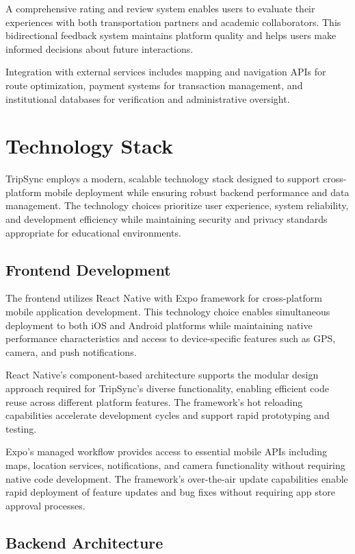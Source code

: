 \documentclass[conference]{IEEEtran}
\begin{document}
A comprehensive rating and review system enables users to evaluate their experiences with both transportation partners and academic collaborators. This bidirectional feedback system maintains platform quality and helps users make informed decisions about future interactions.

Integration with external services includes mapping and navigation APIs for route optimization, payment systems for transaction management, and institutional databases for verification and administrative oversight.

\section{Technology Stack}

TripSync employs a modern, scalable technology stack designed to support cross-platform mobile deployment while ensuring robust backend performance and data management. The technology choices prioritize user experience, system reliability, and development efficiency while maintaining security and privacy standards appropriate for educational environments.

\subsection{Frontend Development}

The frontend utilizes React Native with Expo framework for cross-platform mobile application development. This technology choice enables simultaneous deployment to both iOS and Android platforms while maintaining native performance characteristics and access to device-specific features such as GPS, camera, and push notifications.

React Native's component-based architecture supports the modular design approach required for TripSync's diverse functionality, enabling efficient code reuse across different platform features. The framework's hot reloading capabilities accelerate development cycles and support rapid prototyping and testing.

Expo's managed workflow provides access to essential mobile APIs including maps, location services, notifications, and camera functionality without requiring native code development. The framework's over-the-air update capabilities enable rapid deployment of feature updates and bug fixes without requiring app store approval processes.

\subsection{Backend Architecture}
\end{document}
